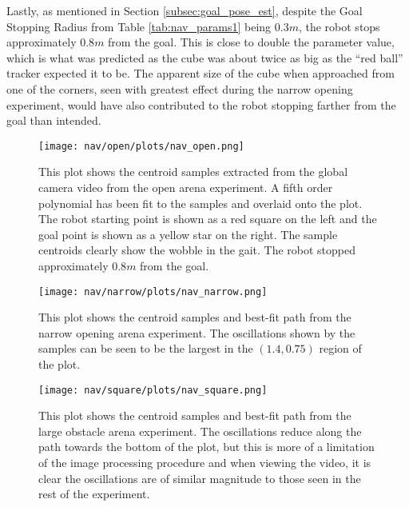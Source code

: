 Lastly, as mentioned in Section \ref{subsec:goal_pose_est}, despite the Goal Stopping
Radius from Table \ref{tab:nav_params1} being $0.3 m$, the robot stops approximately
$0.8 m$ from the goal. This is close to double the parameter value, which is what was predicted
as the cube was about twice as big as the ``red ball'' tracker expected it to be.
The apparent size of the cube when approached from one of the corners, seen with greatest
effect during the narrow opening experiment, would have also contributed to the robot
stopping farther from the goal than intended.

\begin{figure}
  \centering
  \texttt{[image: nav/open/plots/nav\_open.png]}
  \caption{This plot shows the centroid samples extracted from the global camera video from
           the open arena experiment. A fifth order polynomial has been fit to the samples
           and overlaid onto the plot.
           The robot starting point is shown as a red square on the left and the goal point 
           is shown as a yellow star on the right.
           The sample centroids clearly show the wobble in the gait.
           The robot stopped approximately $0.8 m$ from the goal.}
  \label{fig:nav_open_plot1}
\end{figure}

\begin{figure}
  \centering
  \texttt{[image: nav/narrow/plots/nav\_narrow.png]}
  \caption{This plot shows the centroid samples and best-fit path from the narrow opening arena experiment. 
           The oscillations shown by the samples can be seen to be the largest in the
           $(1.4, 0.75)$ region of the plot.}
  \label{fig:nav_narrow_plot1}
\end{figure}

\begin{figure}
  \centering
  \texttt{[image: nav/square/plots/nav\_square.png]}
  \caption{This plot shows the centroid samples and best-fit path from the large obstacle arena experiment.
           The oscillations reduce along the path towards the bottom of the plot, but this is more of
           a limitation of the image processing procedure and when viewing the video, it is clear the oscillations
           are of similar magnitude to those seen in the rest of the experiment.}
  \label{fig:nav_square_plot1}
\end{figure}